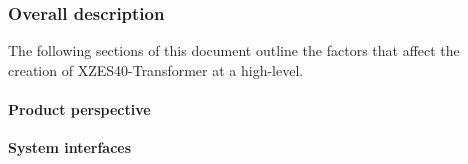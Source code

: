 \subsubsection{Overall description}


The following sections of this document outline the factors that affect the creation of XZES40-Transformer at a high-level.

\paragraph{Product perspective}

\textbf{System interfaces}

